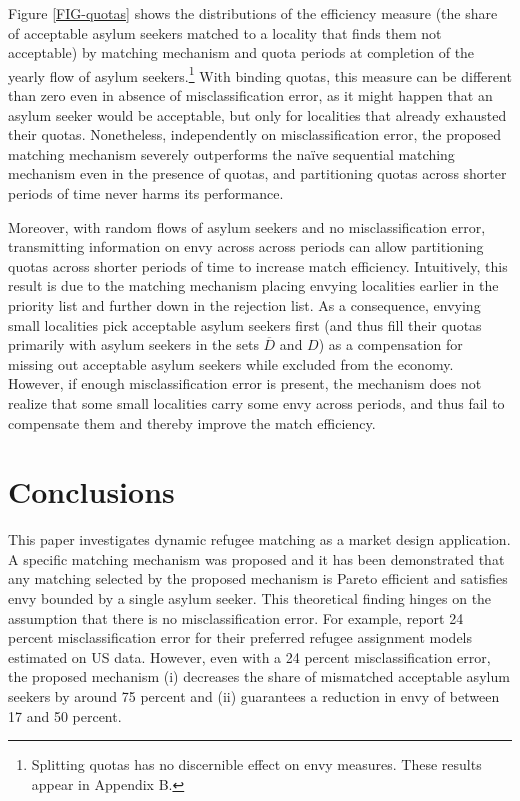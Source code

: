 \documentclass[12pt,fleqn]{article}
\begin{document}
Figure \ref{FIG-quotas} shows the distributions of the efficiency measure (the share of acceptable asylum seekers matched to a locality that finds them not acceptable) by matching mechanism and quota periods at completion of the yearly flow of asylum seekers.\footnote{Splitting quotas has no discernible effect on envy measures. These results appear in Appendix B.} With binding quotas, this measure can be different than zero even in absence of misclassification error, as it might happen that an asylum seeker would be acceptable, but only for localities that already exhausted their quotas. Nonetheless, independently on misclassification error, the proposed matching mechanism severely outperforms the na\"{i}ve sequential matching mechanism even in the presence of quotas, and partitioning quotas across shorter periods of time never harms its performance.

Moreover, with random flows of asylum seekers and no misclassification error, transmitting information on envy across across periods can allow partitioning quotas across shorter periods of time to increase match efficiency. Intuitively, this result is due to the matching mechanism placing envying localities earlier in the priority list and further down in the rejection list. As a consequence, envying small localities pick acceptable asylum seekers first (and thus fill their quotas primarily with asylum seekers in the sets $\overline{D}$ and $D$) as a compensation for missing out acceptable asylum seekers while excluded from the economy. However, if enough misclassification error is present, the mechanism does not realize that some small localities carry some envy across periods, and thus fail to compensate them and thereby improve the match efficiency.

\section{Conclusions}\label{SEC:conclusions}
This paper investigates dynamic refugee matching as a market design application. A specific matching mechanism was proposed and it has been demonstrated that any matching selected by the proposed mechanism is Pareto efficient and satisfies envy bounded by a single asylum seeker. This theoretical finding hinges on the assumption that there is no misclassification error. For example, \cite{bib:BansakEtAl} report 24 percent misclassification error for their preferred refugee assignment models estimated on US data. However, even with a 24 percent misclassification error, the proposed mechanism (i) decreases the share of mismatched acceptable asylum seekers by around 75 percent and (ii) guarantees a reduction in envy of between 17 and 50 percent.
\end{document}
